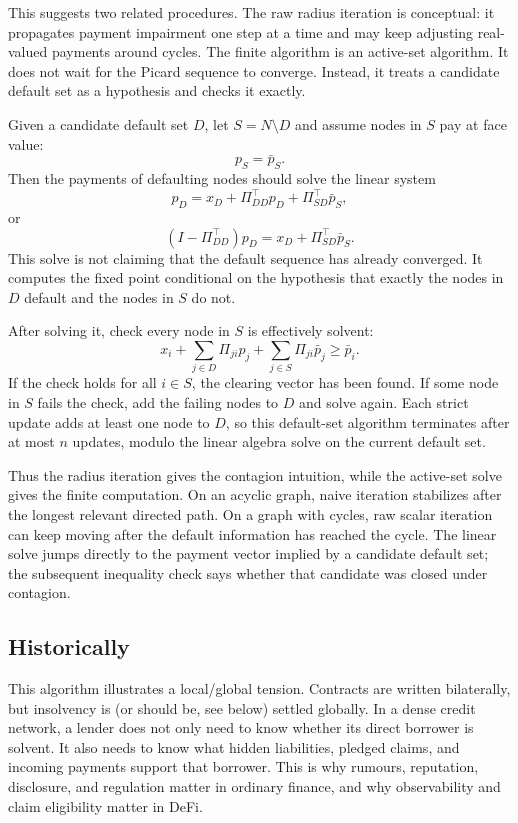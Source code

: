 \documentclass[11pt,oneside]{article}
\newcommand{\barp}{\bar p}
\begin{document}
This suggests two related procedures. The raw radius iteration is conceptual:
it propagates payment impairment one step at a time and may keep adjusting
real-valued payments around cycles. The finite algorithm is an active-set
algorithm. It does not wait for the Picard sequence to converge. Instead, it
treats a candidate default set as a hypothesis and checks it exactly.

Given a candidate default set $D$, let $S=N\setminus D$ and assume nodes in $S$
pay at face value:
\[
  p_S=\barp_S.
\]
Then the payments of defaulting nodes should solve the linear system
\[
  p_D=x_D+\Pi_{DD}^{\top}p_D+\Pi_{SD}^{\top}\barp_S,
\]
or
\[
  (I-\Pi_{DD}^{\top})p_D=x_D+\Pi_{SD}^{\top}\barp_S.
\]
This solve is not claiming that the default sequence has already converged. It
computes the fixed point conditional on the hypothesis that exactly the nodes
in $D$ default and the nodes in $S$ do not.

After solving it, check every node in $S$ is effectively solvent:
\[
  x_i+\sum_{j\in D}\Pi_{ji}p_j+\sum_{j\in S}\Pi_{ji}\barp_j\geq \barp_i.
\]
If the check holds for all $i\in S$, the clearing vector has been found. If
some node in $S$ fails the check, add the failing nodes to $D$ and solve again.
Each strict update adds at least one node to $D$, so this default-set algorithm
terminates after at most $n$ updates, modulo the linear algebra solve on the
current default set.

Thus the radius iteration gives the contagion intuition, while the active-set
solve gives the finite computation. On an acyclic graph, naive iteration
stabilizes after the longest relevant directed path. On a graph with cycles,
raw scalar iteration can keep moving after the default information has reached
the cycle. The linear solve jumps directly to the payment vector implied by a
candidate default set; the subsequent inequality check says whether that
candidate was closed under contagion.

\subsection{Historically}
This algorithm illustrates a local/global tension. Contracts are written
bilaterally, but insolvency is (or should be, see below) settled globally.
In a dense credit network, a lender does not only need to know whether its
direct borrower is solvent. It also needs to know what hidden liabilities,
pledged claims, and incoming payments support that borrower. This is why
rumours, reputation, disclosure, and regulation matter in ordinary finance,
and why observability and claim eligibility matter in DeFi.
\end{document}
